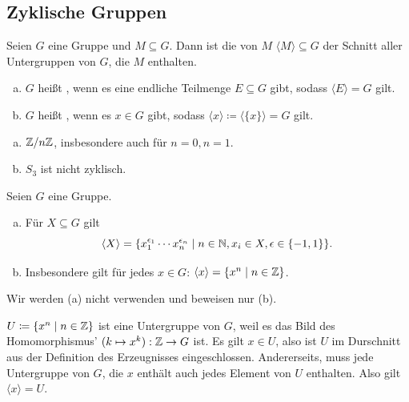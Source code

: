 \subsection{Zyklische Gruppen}

\begin{definition}
  Seien \(G\) eine Gruppe und \(M\subseteq G\).
  Dann ist die von \(M\)  \(\langle M\rangle\subseteq G\) der Schnitt aller Untergruppen von \(G\), die \(M\) enthalten.
  \begin{enumerate}[(a)]
  \item \(G\) heißt , wenn es eine endliche Teilmenge \(E\subseteq G\) gibt, sodass \(\langle E\rangle = G\) gilt.
  \item \(G\) heißt , wenn es \(x\in G\) gibt, sodass \(\langle x\rangle \coloneq \langle\{x\}\rangle =G\) gilt.
  \end{enumerate}
\end{definition}

\begin{beispiel}
  \begin{enumerate}[(a)]
  \item \(\mathbb{Z}/n\mathbb{Z}\), insbesondere auch für \(n=0, n=1\).
  \item \(S_3\) ist nicht zyklisch.
  \end{enumerate}
\end{beispiel}

\begin{bemerkung}
  Seien \(G\) eine Gruppe.
  \begin{enumerate}[(a)]
  \item Für \(X\subseteq G\) gilt
    \[
      \langle X\rangle= \{x_1^{\epsilon_1}\cdots x_n^{\epsilon_n}\mid n\in \mathbb{N}, x_i\in X, \epsilon\in\{-1,1\}\}.
    \]
  \item Insbesondere gilt für jedes \(x\in G\): \(\langle x\rangle = \{x^n\mid n\in \mathbb{Z}\}\).
  \end{enumerate}
\end{bemerkung}

Wir werden (a) nicht verwenden und beweisen nur (b).

\begin{beweis}
  \(U\coloneq \{x^n\mid n\in \mathbb{Z}\}\) ist eine Untergruppe von \(G\), weil es das Bild des Homomorphismus' \((k\mapsto x^k):\mathbb{Z}\to G\) ist. Es gilt \(x\in U\), also ist \(U\) im Durschnitt aus der Definition des Erzeugnisses eingeschlossen. Andererseits, muss jede Untergruppe von \(G\), die \(x\) enthält auch jedes Element von \(U\) enthalten. Also gilt \(\langle x\rangle=U\).
\end{beweis}

